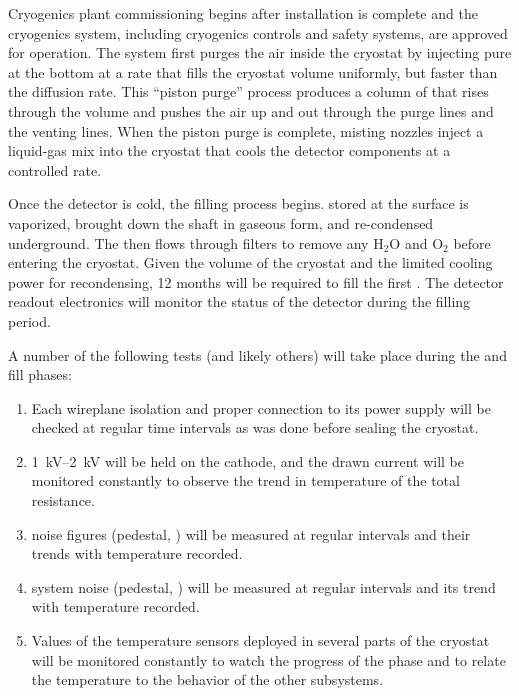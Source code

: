 Cryogenics plant commissioning begins after installation is complete and the cryogenics system, including cryogenics controls and safety  systems, are approved for operation.
The system first purges the air inside the cryostat  by injecting pure  at the bottom  at a rate that fills the cryostat volume uniformly, but faster than the diffusion rate. This ``piston purge'' process produces a column of   that rises through the volume and pushes the air up and out through the  purge lines and the  venting lines.  When the piston purge is complete, misting nozzles inject a liquid-gas mix into the cryostat that cools the detector components at a controlled rate. 


Once the detector is cold, the filling process begins.  stored at the surface  
is vaporized, brought down the shaft in gaseous form, and re-condensed underground. The  then flows through filters to remove any H$_2$O and O$_2$ before entering the cryostat. Given the volume of the cryostat and the limited cooling power for recondensing, \num{12} months will be required to fill the first . The detector readout electronics will  monitor the status of the detector during the filling period. 



A number of the following tests (and likely others) will  take place during the \cooldown and fill phases: 

\begin{enumerate}


    \item Each  wireplane isolation and proper connection to its  power supply will be checked at regular time intervals as was done before sealing the cryostat.
    
    \item \SIrange{1}{2}{kV} will be held on the cathode, and the drawn current will be  monitored constantly to observe the trend in temperature of the total resistance.
    
    \item {} noise figures (pedestal, ) will be measured at regular intervals and their trends with temperature recorded.
    
    \item {} system noise (pedestal, ) will be measured at regular intervals and its trend with temperature recorded.
    
     \item Values of the temperature sensors deployed in several parts of the cryostat will be monitored constantly to watch the progress of the \cooldown phase and to relate the temperature to the behavior of the other  subsystems. 
     
\end{enumerate}

